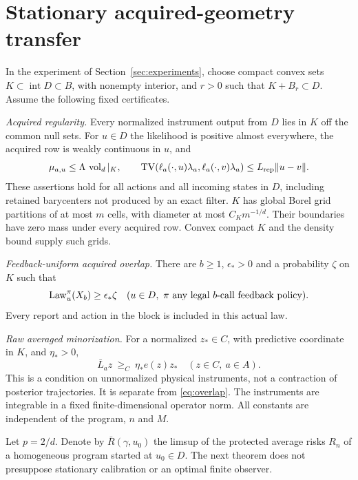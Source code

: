 \section{Stationary acquired-geometry transfer}\label{sec:theorem}
\begin{definition}\label{def:class}
In the experiment of Section~\ref{sec:experiments}, choose compact convex sets $K\subset\operatorname{int}D\subset B$, with nonempty interior, and $r>0$ such that $K+B_r\subset D$. Assume the following fixed certificates.

\emph{Acquired regularity.} Every normalized instrument output from $D$ lies in $K$ off the common null sets. For $u\in D$ the likelihood is positive almost everywhere, the acquired row is weakly continuous in $u$, and
\[
 \mu_{a,u}\le\Lambda\,\operatorname{vol}_d|_K,
 \qquad \operatorname{TV}(\ell_a(\cdot,u)\lambda_a,\ell_a(\cdot,v)\lambda_a)
       \le L_{\rm rep}\lVert u-v\rVert.
\]
These assertions hold for all actions and all incoming states in $D$, including retained barycenters not produced by an exact filter. $K$ has global Borel grid partitions of at most $m$ cells, with diameter at most $C_Km^{-1/d}$. Their boundaries have zero mass under every acquired row. Convex compact $K$ and the density bound supply such grids.

\emph{Feedback-uniform acquired overlap.} There are $b\ge1$, $\epsilon_*>0$ and a probability $\zeta$ on $K$ such that
\begin{equation}\label{eq:overlap}
 \operatorname{Law}_u^\pi(X_b)\ge\epsilon_*\zeta
 \quad(u\in D,\ \pi\text{ any legal $b$-call feedback policy}).
\end{equation}
Every report and action in the block is included in this actual law.

\emph{Raw averaged minorization.} For a normalized $z_*\in C$, with predictive coordinate in $K$, and $\eta_*>0$,
\begin{equation}\label{eq:minorization}
 \bar L_a z\ \ge_C\ \eta_*e(z)z_*
 \quad(z\in C,\ a\in A).
\end{equation}
This is a condition on unnormalized physical instruments, not a contraction of posterior trajectories. It is separate from \eqref{eq:overlap}. The instruments are integrable in a fixed finite-dimensional operator norm. All constants are independent of the program, $n$ and $M$.
\end{definition}

Let $p=2/d$. Denote by $\bar R(\gamma,u_0)$ the limsup of the protected average risks $R_n$ of a homogeneous program started at $u_0\in D$. The next theorem does not presuppose stationary calibration or an optimal finite observer.

